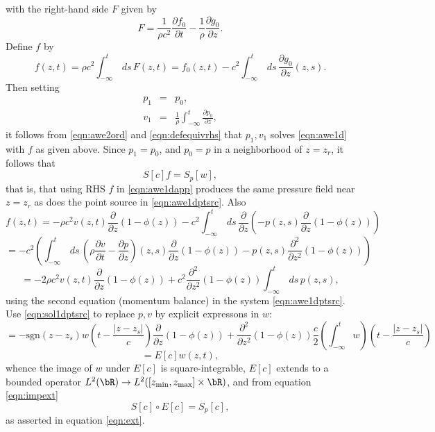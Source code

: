 with the right-hand side $F$ given by
\begin{equation}
  \label{eqn:rhs2ord}
  F = \frac{1}{\rho c^2}\frac{\partial f_0}{\partial t} -
  \frac{1}{\rho}\frac{\partial g_0}{\partial z}.
\end{equation}
Define $f$ by
\begin{equation}
  \label{eqn:defequivrhs}
  f(z,t) = \rho c^2 \int_{-\infty}^t \,ds\,F(z,t) =  f_0(z,t) - c^2\int_{-\infty}^{t}\,ds\,\frac{\partial
    g_0}{\partial z}(z,s).
\end{equation}
Then setting
\begin{eqnarray*}
  p_1 &=& p_0,\\
  v_1 &=& \frac{1}{\rho}\int_{-\infty}^t\frac{\partial p_0}{\partial z},
\end{eqnarray*}
it follows from \ref{eqn:awe2ord} and \ref{eqn:defequivrhs} that
$p_1,v_1$ solves \ref{eqn:awe1d} with $f$ as given above. Since
$p_1=p_0$, and $p_0=p$ in a neighborhood of $z=z_r$, it follows that
\begin{equation}
  \label{eqn:impext}
  S[c]f = S_p[w],
\end{equation}
that is, that using RHS $f$ in \ref{eqn:awe1dapp} produces the same
pressure field near $z=z_r$ as does the point source in
\ref{eqn:awe1dptsrc}. Also
\[
  f(z,t) = -\rho c^2 v(z,t) \frac{\partial}{\partial z}(1-\phi(z)) - c^2
  \int_{-\infty}^t\,ds\, \frac{\partial}{\partial z}\left(-p(z,s) \frac{\partial}{\partial z}(1-\phi(z))\right)
\]
\[
  = - c^2 \left(\int_{-\infty}^t\,ds\,\left( \rho \frac{\partial v}{\partial
      t} -\frac{\partial p}{\partial
      z}\right)(z,s)\frac{\partial}{\partial z}(1-\phi(z))
  -p(z,s)\frac{\partial^2}{\partial z^2}(1-\phi(z)) \right)
\]
\[
  = -2\rho c^2 v(z,t)\frac{\partial}{\partial z}(1-\phi(z)) +
  c^2\frac{\partial^2}{\partial z^2}(1-\phi(z))\int_{-\infty}^t
  \,ds\,p(z,s),
\]
using the second equation (momentum balance) in the system
\ref{eqn:awe1dptsrc}. Use \ref{eqn:sol1dptsrc} to replace $p,v$ by
explicit expressons in $w$:
\[
    = -\mbox{sgn}(z-z_s)w\left(t -\frac{|z-z_s|}{c}\right)\frac{\partial}{\partial z}(1-\phi(z)) +
  \frac{\partial^2}{\partial z^2}(1-\phi(z))\frac{c}{2}\left(\int_{-\infty}^tw\right)\left(t - \frac{|z-z_s|}{c}\right)
\]
\begin{equation}
  \label{eqn:defextop}
  =E[c]w(z,t),
\end{equation}
whence the image of $w$ under $E[c]$ is square-integrable,
$E[c]$ extends to a bounded operator $L^2(\bR) \rightarrow
L^2([z_{\rm min},z_{\rm max}]\times \bR)$, and from equation \ref{eqn:impext}
\begin{equation}
  \label{eqn:extapp}
S[c]\circ E[c] = S_p[c],
\end{equation}
as asserted in equation \ref{eqn:ext}.




